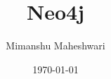 \documentclass{report}
\title{\textbf{Neo4j}}
\author{Mimanshu Maheshwari}
\date{\today}
\begin{document}
\maketitle
\tableofcontents
\listoffigures
\lstlistoflistings




\printglossaries
\end{document}
